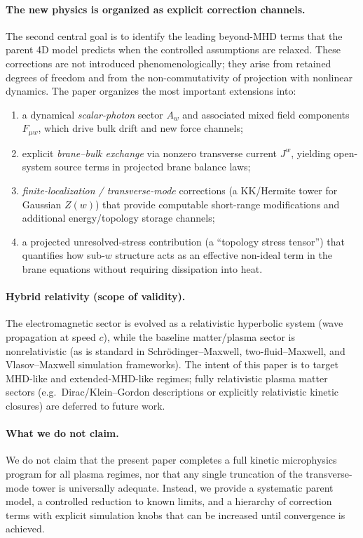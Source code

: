 \documentclass[11pt]{article}
\begin{document}
\paragraph{The new physics is organized as explicit correction channels.}
The second central goal is to identify the leading beyond-MHD terms that the parent 4D model predicts when the controlled assumptions are relaxed. These corrections are not introduced phenomenologically; they arise from retained degrees of freedom and from the non-commutativity of projection with nonlinear dynamics. The paper organizes the most important extensions into:
\begin{enumerate}[leftmargin=1.5em]
\item a dynamical \emph{scalar-photon} sector \(A_w\) and associated mixed field components \(F_{\mu w}\), which drive bulk drift and new force channels;
\item explicit \emph{brane--bulk exchange} via nonzero transverse current \(J^w\), yielding open-system source terms in projected brane balance laws;
\item \emph{finite-localization / transverse-mode} corrections (a KK/Hermite tower for Gaussian \(Z(w)\)) that provide computable short-range modifications and additional energy/topology storage channels;
\item a projected unresolved-stress contribution (a ``topology stress tensor'') that quantifies how sub-\(w\) structure acts as an effective non-ideal term in the brane equations without requiring dissipation into heat.
\end{enumerate}

\paragraph{Hybrid relativity (scope of validity).}
The electromagnetic sector is evolved as a relativistic hyperbolic system (wave propagation at speed \(c\)), while the baseline matter/plasma sector is nonrelativistic (as is standard in Schr\"odinger--Maxwell, two-fluid--Maxwell, and Vlasov--Maxwell simulation frameworks). The intent of this paper is to target MHD-like and extended-MHD-like regimes; fully relativistic plasma matter sectors (e.g.\ Dirac/Klein--Gordon descriptions or explicitly relativistic kinetic closures) are deferred to future work.

\paragraph{What we do not claim.}
We do not claim that the present paper completes a full kinetic microphysics program for all plasma regimes, nor that any single truncation of the transverse-mode tower is universally adequate. Instead, we provide a systematic parent model, a controlled reduction to known limits, and a hierarchy of correction terms with explicit simulation knobs that can be increased until convergence is achieved.
\end{document}
